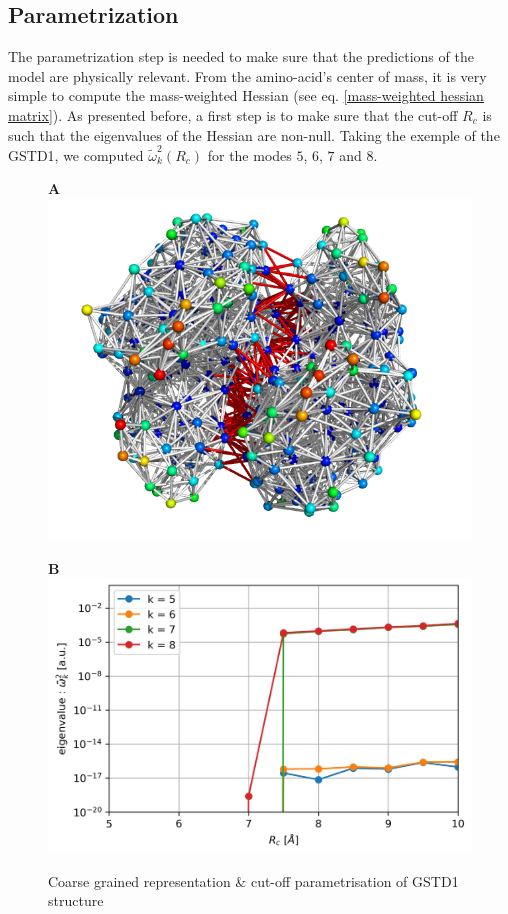 \subsection{Parametrization}
\noindent The parametrization step is needed to make sure that the predictions of the model are physically relevant. From the amino-acid's center of mass, it is very simple to compute the mass-weighted Hessian (see eq. \ref{mass-weighted hessian matrix}). As presented before, a first step is to make sure that the cut-off $R_c$ is such that the eigenvalues of the Hessian are non-null. Taking the exemple of the GSTD1, we computed $\tilde{\omega}_k^2 (R_c)$ for the modes $5$, $6$, $7$ and $8$. 

\begin{figure}[h!]
	\label{Rc param}
	\begin{minipage}{.48\linewidth}
		\textbf{A}\\
		\includegraphics[width = .99\linewidth]{figures/GSTD1_ElasticNetwork.png}
	\end{minipage}	
	\begin{minipage}{.48\linewidth}
		\textbf{B}\\
		\includegraphics[width = .99\linewidth]{figures/GSTD1_ANM-COM_Rc_param.jpg}\\[.5cm]
	\end{minipage}	
	\caption{Coarse grained representation \& cut-off parametrisation of GSTD1 structure}	
\end{figure}

